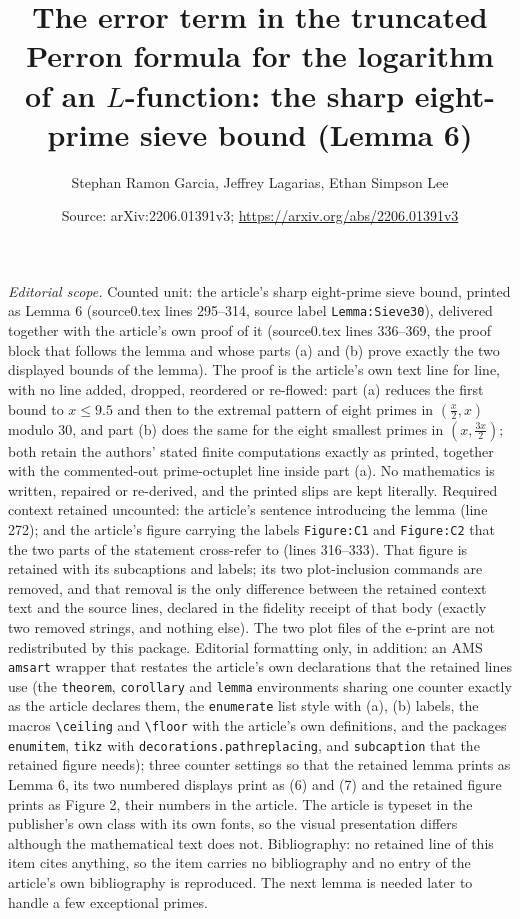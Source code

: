 \documentclass[10pt,a4paper]{amsart}
\title{The error term in the truncated Perron formula for the logarithm of an $L$-function: the sharp eight-prime sieve bound (Lemma 6)}
\author{Stephan Ramon Garcia, Jeffrey Lagarias, Ethan Simpson Lee}
\date{Source: arXiv:2206.01391v3; \url{https://arxiv.org/abs/2206.01391v3}}
\theoremstyle{plain}
\begin{document}
\maketitle
\noindent\textit{Editorial scope.} Counted unit: the article's sharp eight-prime sieve bound, printed as Lemma 6 (source0.tex lines 295--314, source label \texttt{Lemma:Sieve30}), delivered together with the article's own proof of it (source0.tex lines 336--369, the proof block that follows the lemma and whose parts (a) and (b) prove exactly the two displayed bounds of the lemma). The proof is the article's own text line for line, with no line added, dropped, reordered or re-flowed: part (a) reduces the first bound to $x \leq 9.5$ and then to the extremal pattern of eight primes in $(\frac{x}{2},x)$ modulo $30$, and part (b) does the same for the eight smallest primes in $(x,\frac{3x}{2})$; both retain the authors' stated finite computations exactly as printed, together with the commented-out prime-octuplet line inside part (a). No mathematics is written, repaired or re-derived, and the printed slips are kept literally.
Required context retained uncounted: the article's sentence introducing the lemma (line 272); and the article's figure carrying the labels \texttt{Figure:C1} and \texttt{Figure:C2} that the two parts of the statement cross-refer to (lines 316--333). That figure is retained with its subcaptions and labels; its two plot-inclusion commands are removed, and that removal is the only difference between the retained context text and the source lines, declared in the fidelity receipt of that body (exactly two removed strings, and nothing else). The two plot files of the e-print are not redistributed by this package.
Editorial formatting only, in addition: an AMS \texttt{amsart} wrapper that restates the article's own declarations that the retained lines use (the \texttt{theorem}, \texttt{corollary} and \texttt{lemma} environments sharing one counter exactly as the article declares them, the \texttt{enumerate} list style with (a), (b) labels, the macros \texttt{\textbackslash ceiling} and \texttt{\textbackslash floor} with the article's own definitions, and the packages \texttt{enumitem}, \texttt{tikz} with \texttt{decorations.pathreplacing}, and \texttt{subcaption} that the retained figure needs); three counter settings so that the retained lemma prints as Lemma 6, its two numbered displays print as (6) and (7) and the retained figure prints as Figure 2, their numbers in the article. The article is typeset in the publisher's own class with its own fonts, so the visual presentation differs although the mathematical text does not.
Bibliography: no retained line of this item cites anything, so the item carries no bibliography and no entry of the article's own bibliography is reproduced.
The next lemma is needed later to handle a few exceptional primes.
\end{document}
